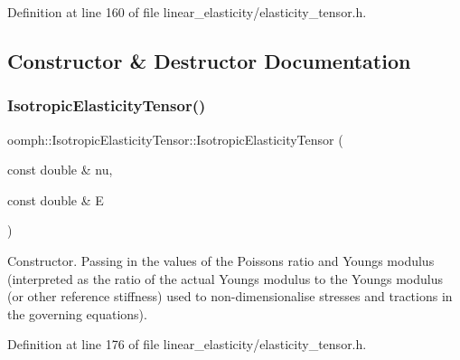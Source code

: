 Definition at line 160 of file linear\+\_\+elasticity/elasticity\+\_\+tensor.\+h.



\subsection{Constructor \& Destructor Documentation}
\mbox{\label{classoomph_1_1IsotropicElasticityTensor_a022f9a6cb2339393a2cbc8eee81717e5}} 
\subsubsection{\texorpdfstring{Isotropic\+Elasticity\+Tensor()}{IsotropicElasticityTensor()}\hspace{0.1cm}{\footnotesize\ttfamily [1/6]}}
{\footnotesize\ttfamily oomph\+::\+Isotropic\+Elasticity\+Tensor\+::\+Isotropic\+Elasticity\+Tensor (\begin{DoxyParamCaption}\item[{const double \&}]{nu,  }\item[{const double \&}]{E }\end{DoxyParamCaption})\hspace{0.3cm}{\ttfamily [inline]}}



Constructor. Passing in the values of the Poisson\textquotesingle{}s ratio and Young\textquotesingle{}s modulus (interpreted as the ratio of the actual Young\textquotesingle{}s modulus to the Young\textquotesingle{}s modulus (or other reference stiffness) used to non-\/dimensionalise stresses and tractions in the governing equations). 



Definition at line 176 of file linear\+\_\+elasticity/elasticity\+\_\+tensor.\+h.

\mbox{\label{classoomph_1_1IsotropicElasticityTensor_a61cc521701ca584ca74477aab86865f6}} 
